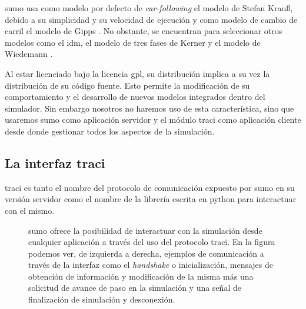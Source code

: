 \gls{sumo} usa como modelo por defecto de \textit{\gls{car-following}} el modelo de Stefan Krauß\cite{jin2016evaluation}, debido a su simplicidad y su velocidad de ejecución y como modelo de cambio de carril el modelo de Gipps \cite{krajzewicz2002sumo}. No obstante, se encuentran para seleccionar otros modelos como el \gls{idm}, el modelo de tres fases de Kerner \cite{kerner2008testbed} y el modelo de Wiedemann \cite{wiedemann1974simulation}.

Al estar licenciado bajo la licencia \gls{gpl}, su distribución implica a su vez la distribución de su código fuente. Esto permite la modificación de su comportamiento y el desarrollo de nuevos modelos integrados dentro del simulador. Sin embargo nosotros no haremos uso de esta característica, sino que usaremos \gls{sumo} como aplicación servidor y el módulo \gls{traci} como aplicación cliente desde donde gestionar todos los aspectos de la simulación.

\subsection{La interfaz \gls{traci}}

\gls{traci} \cite{Wegener2008} es tanto el nombre del protocolo de comunicación expuesto por \gls{sumo} en su versión servidor como el nombre de la librería escrita en \gls{python} para interactuar con el mismo.

\begin{figure}[!b]
	\centering
	\caption[Ejemplo de forma de envío de mensajes a través de TraCI]{\gls{sumo} ofrece la posibilidad de interactuar con la simulación desde cualquier aplicación a través del uso del protocolo \gls{traci}. En la figura podemos ver, de izquierda a derecha, ejemplos de comunicación a través de la interfaz como el \textit{handshake} o inicialización, mensajes de obtención de información y modificación de la misma más una solicitud de avance de paso en la simulación y una señal de finalización de simulación y desconexión.}
	\label{fig:traci-messages}
\end{figure}

